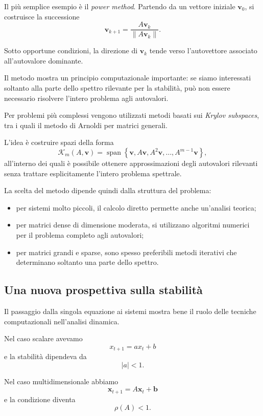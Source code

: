 \documentclass{book}
\begin{document}
Il più semplice esempio è il \emph{power method}. Partendo da un vettore
iniziale $\mathbf{v}_0$, si costruisce la successione
\[
\mathbf{v}_{k+1}
=
\frac{A\mathbf{v}_k}
{\|A\mathbf{v}_k\|}.
\]

Sotto opportune condizioni, la direzione di $\mathbf{v}_k$ tende verso
l'autovettore associato all'autovalore dominante.

Il metodo mostra un principio computazionale importante: se siamo
interessati soltanto alla parte dello spettro rilevante per la stabilità,
può non essere necessario risolvere l'intero problema agli autovalori.

Per problemi più complessi vengono utilizzati metodi basati sui
\emph{Krylov subspaces}, tra i quali il metodo di Arnoldi per matrici
generali.

L'idea è costruire spazi della forma
\[
\mathcal{K}_m(A,\mathbf{v})
=
\operatorname{span}
\left\{
\mathbf{v},
A\mathbf{v},
A^2\mathbf{v},
\ldots,
A^{m-1}\mathbf{v}
\right\},
\]
all'interno dei quali è possibile ottenere approssimazioni degli
autovalori rilevanti senza trattare esplicitamente l'intero problema
spettrale.

La scelta del metodo dipende quindi dalla struttura del problema:

\begin{itemize}
    \item per sistemi molto piccoli, il calcolo diretto permette anche
    un'analisi teorica;
    \item per matrici dense di dimensione moderata, si utilizzano
    algoritmi numerici per il problema completo agli autovalori;
    \item per matrici grandi e sparse, sono spesso preferibili metodi
    iterativi che determinano soltanto una parte dello spettro.
\end{itemize}


\subsection{Una nuova prospettiva sulla stabilità}

Il passaggio dalla singola equazione ai sistemi mostra bene il ruolo delle
tecniche computazionali nell'analisi dinamica.

Nel caso scalare avevamo
\[
x_{t+1}=ax_t+b
\]
e la stabilità dipendeva da
\[
|a|<1.
\]

Nel caso multidimensionale abbiamo
\[
\mathbf{x}_{t+1}
=
A\mathbf{x}_t+\mathbf{b}
\]
e la condizione diventa
\[
\rho(A)<1.
\]
\end{document}
